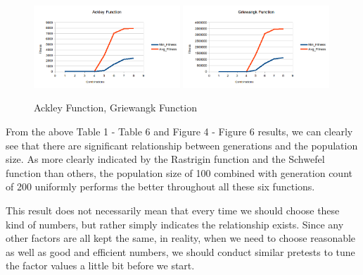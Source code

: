 \documentclass[b5paper,11pt, abstraction, titlepage]{scrartcl}
\begin{document}
\begin{CJK}{UTF8}{gbsn}
\begin{figure}
  \centering
  \includegraphics[width=0.49\textwidth]{ackb}
  \includegraphics[width=0.49\textwidth]{grib}
  \caption{Ackley Function, Griewangk Function}
\end{figure}


From the above Table 1 - Table 6 and Figure 4 - Figure 6 results, we can clearly see that there are significant relationship between generations and the population size. As more clearly indicated by the Rastrigin function and the Schwefel function than others, the population size of 100 combined with generation count of 200 uniformly performs the better throughout all these six functions.

This result does not necessarily mean that every time we should choose these kind of numbers, but rather simply indicates the relationship exists. Since any other factors are all kept the same, in reality, when we need to choose reasonable as well as good and efficient numbers, we should conduct similar pretests to tune the factor values a little bit before we start.



\end{CJK}
\end{document}
